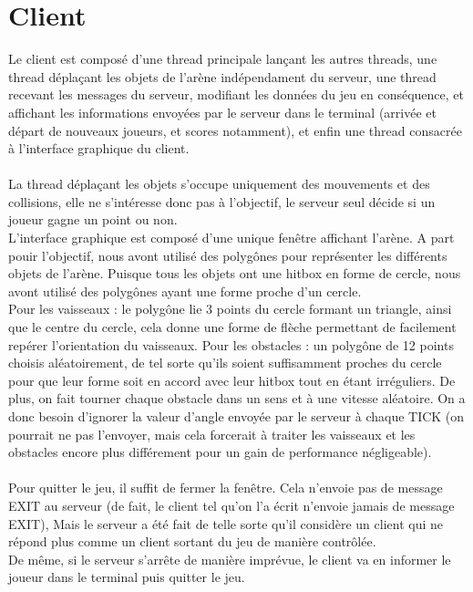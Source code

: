 \documentclass{article}
\begin{document}
\section{Client}

Le client est composé d'une thread principale lançant les autres threads, une thread déplaçant les objets de l'arène indépendament du serveur,
une thread recevant les messages du serveur, modifiant les données du jeu en conséquence, et affichant les informations envoyées par le serveur
dans le terminal (arrivée et départ de nouveaux joueurs, et scores notamment), et enfin une thread consacrée à l'interface graphique du client.\\
\\
La thread déplaçant les objets s'occupe uniquement des mouvements et des collisions, elle ne s'intéresse donc pas à l'objectif, le serveur seul décide si
un joueur gagne un point ou non.
\\
L'interface graphique est composé d'une unique fenêtre affichant l'arène. A part pouir l'objectif, nous avont utilisé des polygônes pour représenter les différents
objets de l'arène. Puisque tous les objets ont une hitbox en forme de cercle, nous avont utilisé des polygônes ayant une forme proche d'un cercle.\\
Pour les vaisseaux : le polygône lie 3 points du cercle formant un triangle, ainsi que le centre du cercle, cela donne une forme de flèche
permettant de facilement repérer l'orientation du vaisseaux.
Pour les obstacles : un polygône de 12 points choisis aléatoirement, de tel sorte qu'ils soient suffisamment proches du cercle pour que leur forme
soit en accord avec leur hitbox tout en étant irréguliers. De plus, on fait tourner chaque obstacle dans un sens et à une vitesse aléatoire. On a donc besoin
d'ignorer la valeur d'angle envoyée par le serveur à chaque TICK (on pourrait ne pas l'envoyer, mais cela forcerait à traiter les vaisseaux et les obstacles encore plus
différement pour un gain de performance négligeable).\\
\\
Pour quitter le jeu, il suffit de fermer la fenêtre. Cela n'envoie pas de message EXIT au serveur (de fait, le client tel qu'on l'a écrit n'envoie jamais de message EXIT),
Mais le serveur a été fait de telle sorte qu'il considère un client qui ne répond plus comme un client sortant du jeu de manière contrôlée.\\
De même, si le serveur s'arrête de manière imprévue, le client va en informer le joueur dans le terminal puis quitter le jeu.
\end{document}
